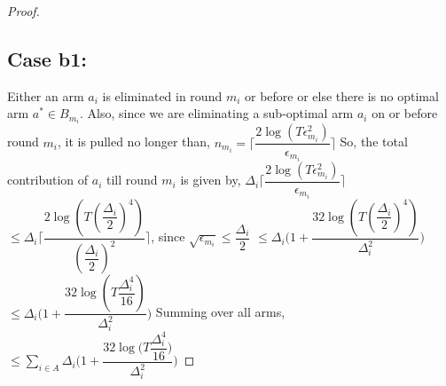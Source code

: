 \begin{proof}
\subsection{Case b1:} 
Either an arm $a_{i}$ is eliminated in round $m_{i}$ or before or else there is no optimal arm $a^{*}\in B_{m_{i}}$.
\newline
Also, since we are eliminating a sub-optimal arm $a_{i}$ on or before round $m_{i}$, it is pulled no longer than,
\newline
\hspace*{4em}$n_{m_{i}}=\bigg\lceil\dfrac{2\log{(T\epsilon_{m_{i}}^{2})}}{\epsilon_{m_{i}}}\bigg\rceil$
\newline
So, the total contribution of $a_{i}$  till round $m_{i}$ is given by,
\newline
\hspace*{4em}$\Delta_{i}\bigg\lceil\dfrac{2\log{(T\epsilon_{m_{i}}^{2})}}{\epsilon_{m_{i}}}\bigg\rceil$
$\leq\Delta_{i}\bigg\lceil\dfrac{2\log{(T(\dfrac{\Delta_{i}}{2})^{4})}}{(\dfrac{\Delta_{i}}{2})^{2}}\bigg\rceil$, since $\sqrt{\epsilon_{m_{i}}}\leq\dfrac{\Delta_{i}}{2}$
\newline
\hspace*{12em}
$\leq\Delta_{i}\bigg(1+\dfrac{32\log{(T(\dfrac{\Delta_{i}}{2})^{4})}}{\Delta_{i}^{2}}\bigg)$
\newline
\hspace*{12em}
$\leq\Delta_{i}\bigg(1+\dfrac{32\log{(T\dfrac{\Delta_{i}^{4}}{16})}}{\Delta_{i}^{2}}\bigg)$
\newline
Summing over all arms,
\newline
\hspace*{4em}$\leq\sum_{i\in A}\Delta_{i}\bigg(1+\dfrac{32\log{(T\dfrac{\Delta_{i}^{4}}{16}})}{\Delta_{i}^{2}}\bigg)$

\end{proof}
